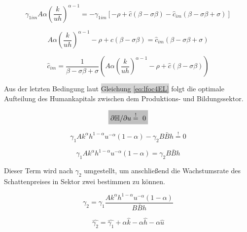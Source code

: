 	\begin{equation*}
		\gamma_{1im} A \alpha \left(\frac{k}{uh}\right)^{\alpha -1} = - \gamma_{1im} \left [ - \rho + \hat{c} (\beta - \sigma\beta) - \hat{c}_{im} (\beta-\sigma\beta+ \sigma) \right ]
	\end{equation*}


	\begin{equation*}
		A \alpha \left(\frac{k}{uh}\right)^{\alpha -1} - \rho + \hat{c} (\beta - \sigma\beta) = \hat{c}_{im}(\beta-\sigma\beta+ \sigma)
	\end{equation*}


	\begin{equation}
		\boxed{\hat{c}_{im}=\frac{1}{\beta-\sigma\beta+ \sigma}\left(A\alpha \left(\frac{k}{uh}\right)^{\alpha -1}-\rho+\hat{c}(\beta - \sigma\beta)\right)}\label{eq:lKRRim}
	\end{equation}


Aus der letzten Bedingung laut \colorbox{lightgray}{Gleichung \eqref{eq:lfoc4EL}} folgt die optimale Aufteilung des Humankapitals zwischen dem Produktions- und Bildungssektor. 


	\begin{equation}
		\colorbox{lightgray}{$\partial\mathbb{H}/\partial u\overset{!}{=}~0$}
		\label{eq:}
	\end{equation}


	\begin{equation}
		\gamma_{1}Ak^{\alpha}h^{1- \alpha}u^{- \alpha} (1- \alpha) - \gamma_{2} B \bar{B} h\overset{!}{=}0
	\end{equation}


	\begin{equation}
		\gamma_{1}Ak^{\alpha}h^{1- \alpha}u^{- \alpha} (1- \alpha) = \gamma_{2} B \bar{B} h 
		\label{foc4}
	\end{equation}


Dieser Term wird nach $\gamma_2$ umgestellt, um anschlie{\ss}end die Wachstumsrate des Schattenpreises in Sektor zwei bestimmen zu können.


	\begin{equation}
		\gamma_{2} = \gamma_{1} \frac{Ak^{\alpha}h^{1- \alpha} u^{- \alpha} (1- \alpha)} {B \bar{B} h} 
	\end{equation}


	\begin{equation}
		\hat{\gamma_{2}} = \hat{\gamma_{1}} + \alpha \hat{k} - \alpha \hat{h} - \alpha \hat{u}\label{WachstumGamma2EL}
	\end{equation}


